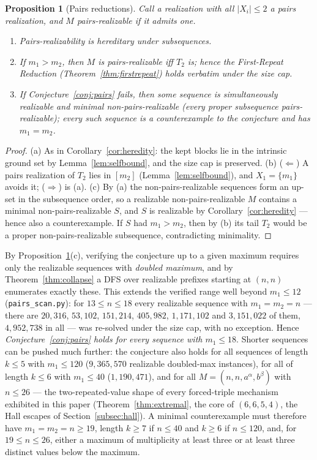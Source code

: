 \documentclass[11pt]{article}
\newtheorem{proposition}[theorem]{Proposition}
\theoremstyle{definition}
\theoremstyle{remark}
\newcommand{\intv}[1]{[#1]}
\begin{document}
\begin{proposition}[Pairs reductions]\label{prop:pairsred}
Call a realization with all $|X_i|\le2$ a \emph{pairs realization}, and $M$
\emph{pairs-realizable} if it admits one.
\begin{enumerate}[label=(\alph*),itemsep=1pt]
\item Pairs-realizability is hereditary under subsequences.
\item If $m_1>m_2$, then $M$ is pairs-realizable iff $T_2$ is; hence the
First-Repeat Reduction (Theorem~\ref{thm:firstrepeat}) holds verbatim under
the size cap.
\item If Conjecture~\ref{conj:pairs} fails, then some sequence is
simultaneously realizable and \emph{minimal} non-pairs-realizable (every
proper subsequence pairs-realizable); every such sequence is a
counterexample to the conjecture and has $m_1=m_2$.
\end{enumerate}
\end{proposition}

\begin{proof}
(a) As in Corollary~\ref{cor:heredity}: the kept blocks lie in the intrinsic
ground set by Lemma~\ref{lem:selfbound}, and the size cap is preserved.
(b) ($\Leftarrow$) A pairs realization of $T_2$ lies in $\intv{m_2}$
(Lemma~\ref{lem:selfbound}), and $X_1=\{m_1\}$ avoids it; ($\Rightarrow$) is
(a). (c) By (a) the non-pairs-realizable sequences form an up-set in the
subsequence order, so a realizable non-pairs-realizable $M$ contains a
minimal non-pairs-realizable $S$, and $S$ is realizable by
Corollary~\ref{cor:heredity} --- hence also a counterexample. If $S$ had
$m_1>m_2$, then by (b) its tail $T_2$ would be a proper
non-pairs-realizable subsequence, contradicting minimality.
\end{proof}

By Proposition~\ref{prop:pairsred}(c), verifying the conjecture up to a given
maximum requires only the realizable sequences with \emph{doubled maximum},
and by Theorem~\ref{thm:collapse} a DFS over realizable prefixes starting at
$(n,n)$ enumerates exactly these. This extends the verified range well
beyond $m_1\le12$ (\texttt{pairs\_scan.py}): for $13\le n\le18$ every
realizable sequence with $m_1=m_2=n$ --- there are $20{,}316$, $53{,}102$,
$151{,}214$, $405{,}982$, $1{,}171{,}102$ and $3{,}151{,}022$ of them,
$4{,}952{,}738$ in all --- was re-solved under the size cap, with no
exception. Hence \emph{Conjecture~\ref{conj:pairs} holds for every sequence
with $m_1\le18$}. Shorter sequences can be pushed much further: the
conjecture also holds for all sequences of length $k\le5$ with $m_1\le120$
($9{,}365{,}570$ realizable doubled-max instances), for all of length
$k\le6$ with $m_1\le40$ ($1{,}190{,}471$), and for all
$M=(n,n,a^{\alpha},b^{\beta})$ with $n\le26$ --- the two-repeated-value
shape of every forced-triple mechanism exhibited in this paper
(Theorem~\ref{thm:extremal}, the core of $(6,6,5,4)$, the Hall escapes of
Section~\ref{subsec:hall}). A minimal counterexample must therefore have
$m_1=m_2=n\ge19$, length $k\ge7$ if $n\le40$ and $k\ge6$ if $n\le120$, and,
for $19\le n\le26$, either a maximum of multiplicity at least three or at
least three distinct values below the maximum.
\end{document}
